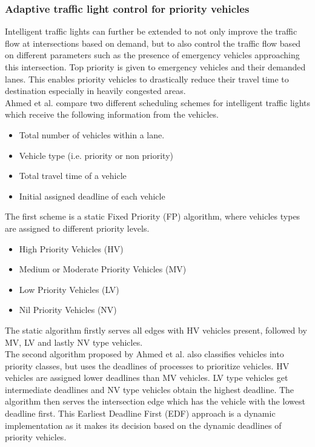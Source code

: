 \documentclass{sig-alternate}
\begin{document}
\subsubsection{Adaptive traffic light control for priority vehicles}
\label{trafficlights}
Intelligent traffic lights can further be extended to not only improve the traffic flow at intersections based on demand, but to also control the traffic flow based on different parameters such as the presence of emergency vehicles approaching this intersection. Top priority is given to emergency vehicles and their demanded lanes. This enables priority vehicles to drastically reduce their travel time to destination especially in heavily congested areas.\\ 
Ahmed et al.\cite{6799827} compare two different scheduling schemes for intelligent traffic lights which receive the following information from the vehicles. 
\begin{itemize}
\item Total number of vehicles within a lane.
\item Vehicle type (i.e. priority or non priority)
\item Total travel time of a vehicle
\item Initial assigned deadline of each vehicle
\end{itemize} 
The first scheme is a static Fixed Priority (FP) algorithm, where vehicles types are assigned to different priority levels. 
\begin{itemize}
\item High Priority Vehicles (HV)
\item Medium or Moderate Priority Vehicles (MV)
\item Low Priority Vehicles (LV)
\item Nil Priority Vehicles (NV)
\end{itemize}
The static algorithm firstly serves all edges with HV vehicles present, followed by MV, LV and lastly NV type vehicles. \\
The second algorithm proposed by Ahmed et al. also classifies vehicles into priority classes, but uses the deadlines of processes to prioritize vehicles. HV vehicles are assigned lower deadlines than MV vehicles. LV type vehicles get intermediate deadlines and NV type vehicles obtain the highest deadline. The algorithm then serves the intersection edge which has the vehicle with the lowest deadline first. This Earliest Deadline First (EDF) approach is a dynamic implementation as it makes its decision based on the dynamic deadlines of priority vehicles.\\
\end{document}
